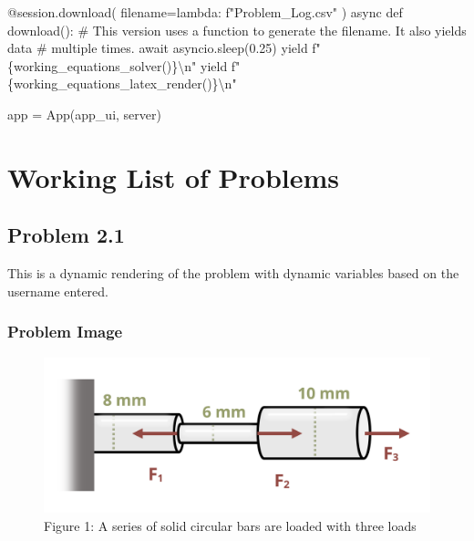 \documentclass[
  letterpaper,
  DIV=11,
  numbers=noendperiod]{scrreprt}
\newenvironment{Shaded}{\begin{snugshade}}{\end{snugshade}}
\newcommand{\NormalTok}[1]{\textcolor[rgb]{0.00,0.23,0.31}{#1}}
\begin{document}
\begin{Shaded}
\begin{Highlighting}[]
        
\NormalTok{    @session.download(}
\NormalTok{    filename=lambda: f"Problem\_Log.csv"}
\NormalTok{    )}
\NormalTok{    async def download():}
\NormalTok{        \# This version uses a function to generate the filename. It also yields data}
\NormalTok{        \# multiple times.}
\NormalTok{          await asyncio.sleep(0.25)}
\NormalTok{          yield f"\{working\_equations\_solver()\}\textbackslash{}n"}
\NormalTok{          yield f"\{working\_equations\_latex\_render()\}\textbackslash{}n"}

\NormalTok{app = App(app\_ui, server)}



\end{Highlighting}
\end{Shaded}

\part{Working List of Problems}

\chapter*{Problem 2.1}\label{problem-2.1}


This is a dynamic rendering of the problem with dynamic variables based
on the username entered.

\section*{Problem Image}\label{problem-image-1}


\begin{figure}[H]

{\centering \includegraphics{images/138.png}

}

\caption{Figure 1: A series of solid circular bars are loaded with three
loads}

\end{figure}%
\end{document}
